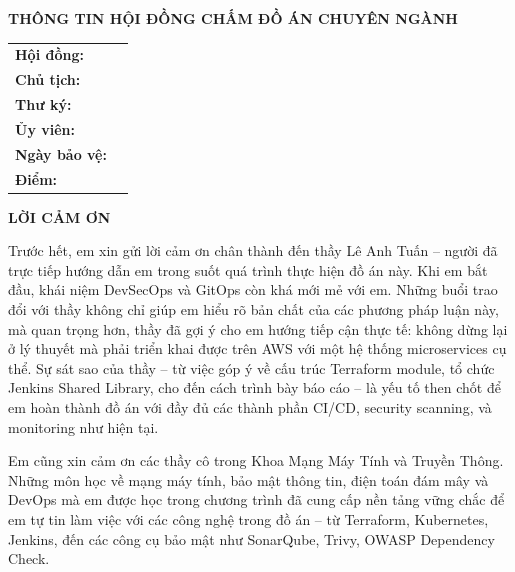 \documentclass[13pt,a4paper,twoside]{extarticle}
\begin{document}
\thispagestyle{empty}
\begin{center}
{\fontsize{14}{18}\bfseries THÔNG TIN HỘI ĐỒNG CHẤM ĐỒ ÁN CHUYÊN NGÀNH}
\end{center}
\vfill

\begin{tabular}{@{}p{5cm} p{10cm}@{}}
\textbf{Hội đồng:} & \dotfill \\[8pt]
\textbf{Chủ tịch:} & \dotfill \\[8pt]
\textbf{Thư ký:}   & \dotfill \\[8pt]
\textbf{Ủy viên:}  & \dotfill \\[8pt]
\textbf{Ngày bảo vệ:} & \dotfill \\[8pt]
\textbf{Điểm:}     & \dotfill \\[8pt]
\end{tabular}

\newpage

\thispagestyle{empty}
\begin{center}
{\fontsize{14}{18}\bfseries LỜI CẢM ƠN}
\end{center}
\vspace{12pt}

Trước hết, em xin gửi lời cảm ơn chân thành đến thầy Lê Anh Tuấn -- người đã trực tiếp hướng dẫn em trong suốt quá trình thực hiện đồ án này. Khi em bắt đầu, khái niệm DevSecOps và GitOps còn khá mới mẻ với em. Những buổi trao đổi với thầy không chỉ giúp em hiểu rõ bản chất của các phương pháp luận này, mà quan trọng hơn, thầy đã gợi ý cho em hướng tiếp cận thực tế: không dừng lại ở lý thuyết mà phải triển khai được trên AWS với một hệ thống microservices cụ thể. Sự sát sao của thầy -- từ việc góp ý về cấu trúc Terraform module, tổ chức Jenkins Shared Library, cho đến cách trình bày báo cáo -- là yếu tố then chốt để em hoàn thành đồ án với đầy đủ các thành phần CI/CD, security scanning, và monitoring như hiện tại.

Em cũng xin cảm ơn các thầy cô trong Khoa Mạng Máy Tính và Truyền Thông. Những môn học về mạng máy tính, bảo mật thông tin, điện toán đám mây và DevOps mà em được học trong chương trình đã cung cấp nền tảng vững chắc để em tự tin làm việc với các công nghệ trong đồ án -- từ Terraform, Kubernetes, Jenkins, đến các công cụ bảo mật như SonarQube, Trivy, OWASP Dependency Check.
\end{document}
